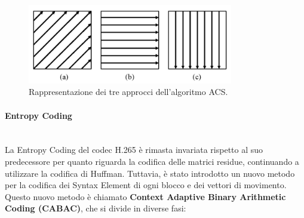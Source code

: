 \documentclass[a4paper,12pt, oneside]{article}
\begin{document}
\begin{figure}[h]
    \centering
    \includegraphics[width=0.8\textwidth]{images/HEVC-ACS.png}
    \caption{Rappresentazione dei tre approcci dell'algoritmo ACS.}
    \label{fig:HEVC_ACS}
\end{figure}

\paragraph{Entropy Coding}\hphantom{A}\\
La Entropy Coding del codec H.265 è rimasta invariata rispetto al suo predecessore per quanto riguarda
la codifica delle matrici residue, continuando a utilizzare la codifica di Huffman. Tuttavia, è stato
introdotto un nuovo metodo per la codifica dei Syntax Element di ogni blocco e dei vettori di movimento.
Questo nuovo metodo è chiamato \textbf{Context Adaptive Binary Arithmetic Coding (CABAC)}, che si divide
in diverse fasi:
\end{document}
